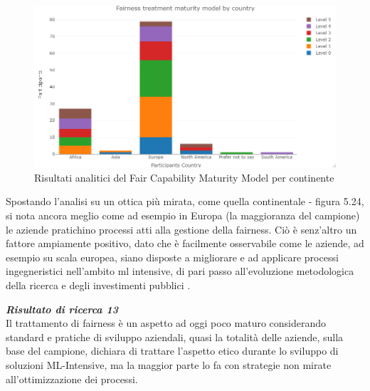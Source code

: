      \begin{figure}[h!]
        \centering
        \includegraphics[width=1\textwidth]{figure/Analisi/RQ5/Fairness treatment maturity model by country.png}
        \caption{Risultati analitici del Fair Capability Maturity Model per continente}
    \end{figure}
    
    Spostando l'analisi su un ottica più mirata, come quella continentale - figura 5.24, si nota ancora meglio come ad esempio in Europa (la maggioranza del campione) le aziende pratichino processi atti alla gestione della fairness. Ciò è senz'altro un fattore ampiamente positivo, dato che è facilmente osservabile come le aziende, ad esempio su scala europea, siano disposte a migliorare e ad applicare processi ingegneristici nell'ambito ml intensive, di pari passo all'evoluzione metodologica della ricerca e degli investimenti pubblici \cite{ritson201317}.
    
    \begin{center}
	
        \begin{tcolorbox}[width=\textwidth, colframe=black, colback=Gray]
    			\begin{minipage}{\textwidth}
    				\textit{\faKey  \textbf{ Risultato di ricerca 13}}\\
    		     Il trattamento di fairness è un aspetto ad oggi poco maturo considerando standard e pratiche di sviluppo aziendali, quasi la totalità delle aziende, sulla base del campione, dichiara di trattare l'aspetto etico durante lo sviluppo di soluzioni ML-Intensive, ma la maggior parte lo fa con strategie non mirate all'ottimizzazione dei processi.
    			\end{minipage}
		\end{tcolorbox}
	\end{center}
	
